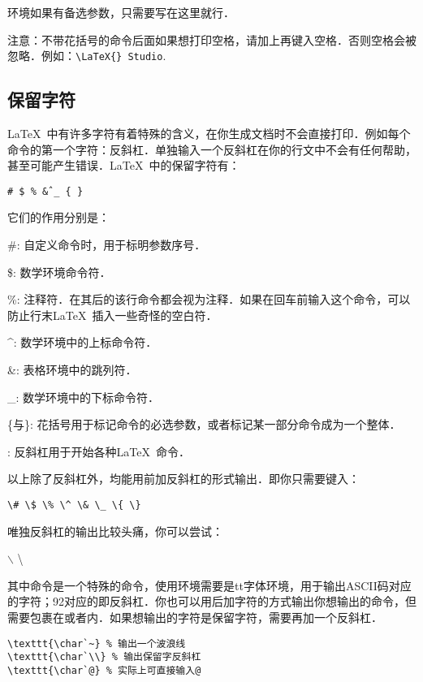 环境如果有备选参数，只需要写在这里就行．

注意：不带花括号的命令后面如果想打印空格，请加上再键入空格．否则空格会被忽略．例如：\verb+\LaTeX{} Studio+.

\subsection{保留字符}

\LaTeX\ 中有许多字符有着特殊的含义，在你生成文档时不会直接打印．例如每个命令的第一个字符：反斜杠．单独输入一个反斜杠在你的行文中不会有任何帮助，甚至可能产生错误．\LaTeX\ 中的保留字符有：
\begin{center}
\texttt{\# \$ \% \^ \& \_ \{ \} }
\end{center}

它们的作用分别是：
\begin{para}
\item[\#{}:] 自定义命令时，用于标明参数序号．
\item[\${}:] 数学环境命令符．
\item[\%{}:] 注释符．在其后的该行命令都会视为注释．如果在回车前输入这个命令，可以防止行末\LaTeX\ 插入一些奇怪的空白符．
\item[\^{}:] 数学环境中的上标命令符．
\item[\&{}:] 表格环境中的跳列符．
\item[\_{}:] 数学环境中的下标命令符．
\item[\{与\}:] 花括号用于标记命令的必选参数，或者标记某一部分命令成为一个整体．
\item[\char92{}:] 反斜杠用于开始各种\LaTeX\ 命令．
\end{para}

以上除了反斜杠外，均能用前加反斜杠的形式输出．即你只需要键入：
\begin{center}
\verb|\# \$ \% \^ \& \_ \{ \}|
\end{center}

唯独反斜杠的输出比较头痛，你可以尝试：
\begin{codeshow}
$\backslash$ \textbackslash
\texttt{}
\end{codeshow}

其中命令是一个特殊的命令，使用环境需要是tt字体环境，用于输出ASCII码对应的字符；92对应的即反斜杠．你也可以用后加字符的方式输出你想输出的命令，但需要包裹在或者内．如果想输出的字符是保留字符，需要再加一个反斜杠．
\begin{verbatim}
\texttt{\char`~} % 输出一个波浪线
\texttt{\char`\\} % 输出保留字反斜杠
\texttt{\char`@} % 实际上可直接输入@
\end{verbatim}

